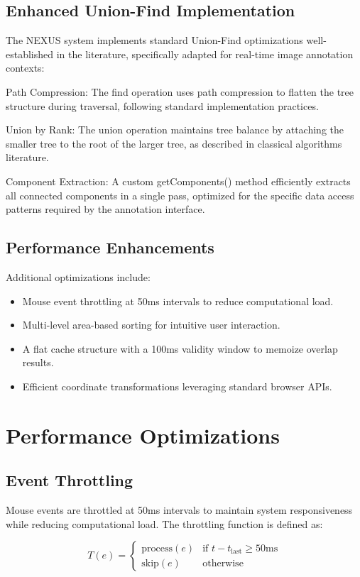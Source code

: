 \documentclass[10pt]{article}
\begin{document}
\subsection{Enhanced Union-Find Implementation}
The NEXUS system implements standard Union-Find optimizations well-established in the literature, specifically adapted for real-time image annotation contexts:

Path Compression: The find operation uses path compression to flatten the tree structure during traversal, following standard implementation practices.

Union by Rank: The union operation maintains tree balance by attaching the smaller tree to the root of the larger tree, as described in classical algorithms literature.

Component Extraction: A custom getComponents() method efficiently extracts all connected components in a single pass, optimized for the specific data access patterns required by the annotation interface.

\subsection{Performance Enhancements}
Additional optimizations include:
\begin{itemize}
    \item Mouse event throttling at 50ms intervals to reduce computational load.
    \item Multi-level area-based sorting for intuitive user interaction.
    \item A flat cache structure with a 100ms validity window to memoize overlap results.
    \item Efficient coordinate transformations leveraging standard browser APIs.
\end{itemize}

\section{Performance Optimizations}
\subsection{Event Throttling}
Mouse events are throttled at 50ms intervals to maintain system responsiveness while reducing computational load. The throttling function is defined as:

\begin{equation}
    T(e) = \begin{cases}
        \text{process}(e) & \text{if } t - t_{\text{last}} \geq 50\text{ms}\\
        \text{skip}(e) & \text{otherwise}
    \end{cases}
\end{equation}
\end{document}
